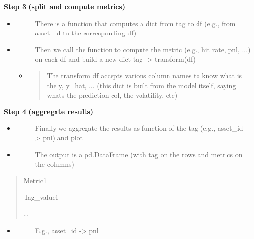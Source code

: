 \documentclass[11pt, reqno]{amsart}
\begin{document}
\textbf{Step 3 (split and compute metrics)}

\begin{itemize}
\item
  \begin{quote}
  There is a function that computes a dict from tag to df (e.g., from
  asset\_id to the corresponding df)
  \end{quote}
\item
  \begin{quote}
  Then we call the function to compute the metric (e.g., hit rate, pnl,
  ...) on each df and build a new dict tag -\textgreater{} transform(df)
  \end{quote}

  \begin{itemize}
  \item
    \begin{quote}
    The transform df accepts various column names to know what is the y,
    y\_hat, ... (this dict is built from the model itself, saying
    what\textquotesingle s the prediction col, the volatility, etc)
    \end{quote}
  \end{itemize}
\end{itemize}

\textbf{Step 4 (aggregate results)}

\begin{itemize}
\item
  \begin{quote}
  Finally we aggregate the results as function of the tag (e.g.,
  asset\_id -\textgreater{} pnl) and plot
  \end{quote}
\item
  \begin{quote}
  The output is a pd.DataFrame (with tag on the rows and metrics on the
  columns)
  \end{quote}
\end{itemize}

\begin{quote}
Metric1

Tag\_value1

\ldots{}
\end{quote}

\begin{itemize}
\item
  \begin{quote}
  E.g., asset\_id -\textgreater{} pnl
  \end{quote}
\end{itemize}
\end{document}
